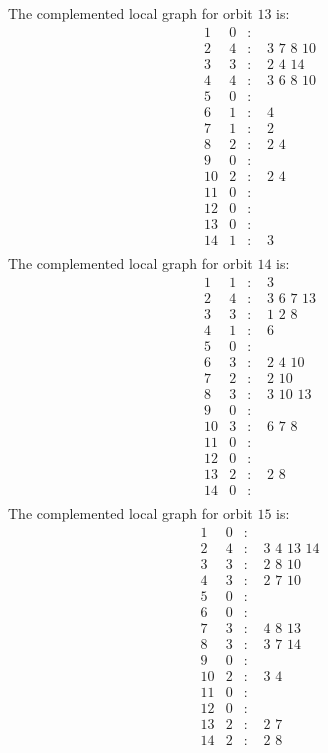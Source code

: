 \documentclass[12pt]{article}
\begin{document}
The complemented local graph for orbit $13$ is:
\begin{equation*}
\begin{array}{rrcl}
1&0&:&\\
2&4&:&\,\,3\,\,7\,\,8\,\,10\\
3&3&:&\,\,2\,\,4\,\,14\\
4&4&:&\,\,3\,\,6\,\,8\,\,10\\
5&0&:&\\
6&1&:&\,\,4\\
7&1&:&\,\,2\\
8&2&:&\,\,2\,\,4\\
9&0&:&\\
10&2&:&\,\,2\,\,4\\
11&0&:&\\
12&0&:&\\
13&0&:&\\
14&1&:&\,\,3\\
\end{array}
\end{equation*}
The complemented local graph for orbit $14$ is:
\begin{equation*}
\begin{array}{rrcl}
1&1&:&\,\,3\\
2&4&:&\,\,3\,\,6\,\,7\,\,13\\
3&3&:&\,\,1\,\,2\,\,8\\
4&1&:&\,\,6\\
5&0&:&\\
6&3&:&\,\,2\,\,4\,\,10\\
7&2&:&\,\,2\,\,10\\
8&3&:&\,\,3\,\,10\,\,13\\
9&0&:&\\
10&3&:&\,\,6\,\,7\,\,8\\
11&0&:&\\
12&0&:&\\
13&2&:&\,\,2\,\,8\\
14&0&:&\\
\end{array}
\end{equation*}
The complemented local graph for orbit $15$ is:
\begin{equation*}
\begin{array}{rrcl}
1&0&:&\\
2&4&:&\,\,3\,\,4\,\,13\,\,14\\
3&3&:&\,\,2\,\,8\,\,10\\
4&3&:&\,\,2\,\,7\,\,10\\
5&0&:&\\
6&0&:&\\
7&3&:&\,\,4\,\,8\,\,13\\
8&3&:&\,\,3\,\,7\,\,14\\
9&0&:&\\
10&2&:&\,\,3\,\,4\\
11&0&:&\\
12&0&:&\\
13&2&:&\,\,2\,\,7\\
14&2&:&\,\,2\,\,8\\
\end{array}
\end{equation*}
\end{document}
